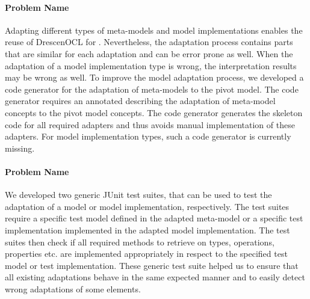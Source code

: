	\paragraph{Problem Name}
	Adapting different types of meta-models and model
	implementations enables the reuse of DrescenOCL for .
	Nevertheless, the adaptation process contains parts that are similar 
	for each adaptation and can be error
	prone as well. 
	When the adaptation of a model implementation 
	type is wrong, the interpretation results may be wrong as well. 
	To improve the model adaptation process, we developed a code generator 
	for the adaptation of meta-models to the pivot model. The code 
	generator requires an annotated  describing
	the adaptation of meta-model concepts to the pivot model concepts. 
	The code generator generates the skeleton code for all required 
	adapters and thus avoids manual implementation of these adapters. 
	For model implementation types, such a code generator is currently 
	missing.
	
	\paragraph{Problem Name}
	 We developed two generic JUnit test suites, 
	that can be used to test the  adaptation of a model 
	or model implementation, respectively. The test suites require a specific test model defined in the
	adapted meta-model or a specific test implementation implemented in the 
	adapted model implementation. 
	The test suites then check if all required methods to 
	retrieve on types, operations, properties etc. are implemented 
	appropriately in respect to the specified test model or test 
	implementation. These generic test suite helped us to ensure 
	that all existing adaptations behave in the same expected manner
	and to easily detect wrong adaptations of some elements.
